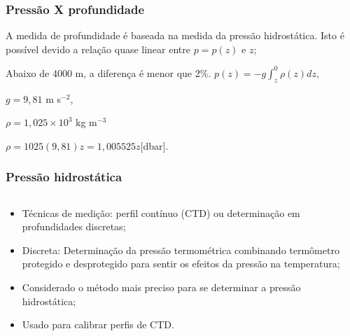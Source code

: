\begin{frame}
\frametitle{Pressão X profundidade}
    \begin{block}{}
    A medida de profundidade é baseada na medida da pressão hidrostática.
    Isto é possível devido a relação quase linear entre $p = p(z)$ e $z$;
    \end{block}

    \pause
    \begin{block}{}
    Abaixo de 4000 m, a diferença é menor que 2\%.
    $p(z) = -g\int^0_z\rho(z)dz,$

    $g = 9,81$ m s$^{-2}$,

    $\rho = 1,025 \times 10^3$ kg m$^{-3}$

    $\rho = 1025 (9,81)z = 1,005525z$[dbar].
    \end{block}
\end{frame}

\begin{frame}
\frametitle{Pressão hidrostática}
    \begin{columns}
        \begin{column}{0.7\textwidth}
        \small{
        \begin{itemize}[<+-| alert@+>]
            \item Técnicas de medição: perfil contínuo (CTD) ou determinação
                  em profundidades discretas;
            \item Discreta: Determinação da pressão termométrica combinando
                  termômetro protegido e desprotegido para sentir os efeitos
                  da pressão na temperatura;
            \item Considerado o método mais preciso para se determinar a
                  pressão hidrostática;
            \item Usado para calibrar perfis de CTD.
        \end{itemize}
        }
        \end{column}
    \begin{column}{0.3\textwidth}
    \begin{center}
    \end{center}
    \end{column}
    \end{columns}
\end{frame}

